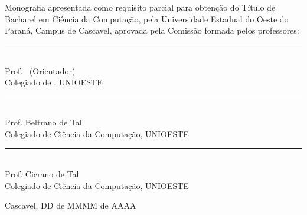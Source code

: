 

\begin{center}
\fontsize{12}{12}
\textbf{\MakeUppercase{\imprimirautor}} \\

\vspace{3cm}
\fontsize{14}{14}
\textbf{\MakeUppercase{\imprimirtitulo}}\\
\vspace{3cm}
\fontsize{10}{10}
Monografia apresentada como requisito parcial para obtenção do Título de Bacharel em Ciência da Computação, pela Universidade Estadual do Oeste do Paraná, Campus de Cascavel, aprovada pela Comissão formada pelos professores:\\
\vspace{2cm}
\begin{flushright}
\begin{minipage}[10cm] {8.5cm}
\begin{center}
\rule{6cm}{0.01mm}\\
Prof. \imprimirorientador\ (Orientador)\\
Colegiado de \imprimircurso, UNIOESTE\\
\vspace{1cm}
\rule{6cm}{0.01mm}\\
Prof. Beltrano de Tal\\
Colegiado de Ciência da Computação, UNIOESTE\\
\vspace{1cm}
\rule{6cm}{0.01mm}\\
Prof. Cicrano de Tal\\
Colegiado de Ciência da Computação, UNIOESTE\\
\end{center}
\end{minipage}
\end{flushright}
\vspace*{\fill}
Cascavel, DD de MMMM de AAAA %
\end{center} 